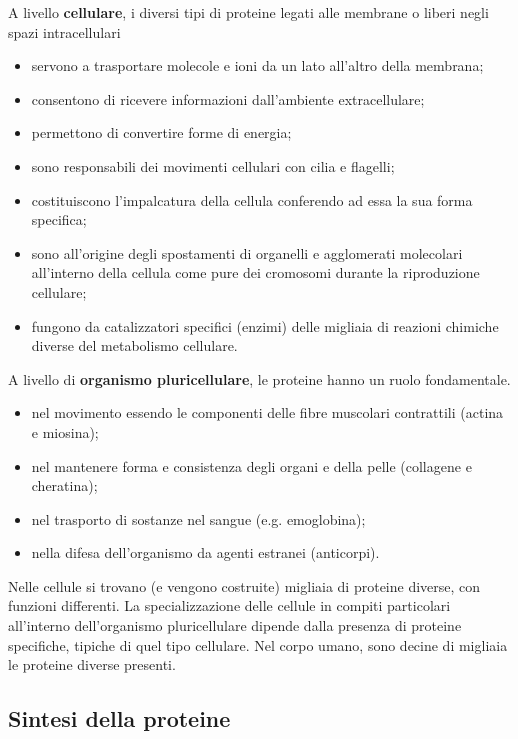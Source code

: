 \documentclass[a4paper]{article}
\begin{document}
A livello \textbf{cellulare}, i diversi tipi di proteine legati alle membrane o liberi negli spazi
intracellulari

\begin{itemize}
    \item servono a trasportare molecole e ioni da un lato all'altro della membrana;
    \item consentono di ricevere informazioni dall'ambiente extracellulare;
    \item permettono di convertire forme di energia;
    \item sono responsabili dei movimenti cellulari con cilia e flagelli;
    \item costituiscono l'impalcatura della cellula conferendo ad essa la sua forma specifica;
    \item sono all'origine degli spostamenti di organelli e agglomerati molecolari all'interno della
    cellula come pure dei cromosomi durante la riproduzione cellulare;
    \item fungono da catalizzatori specifici (enzimi) delle migliaia di reazioni chimiche diverse del
    metabolismo cellulare.
\end{itemize}

A livello di \textbf{organismo pluricellulare}, le proteine hanno un ruolo
fondamentale.

\begin{itemize}
    \item nel movimento essendo le componenti delle fibre muscolari contrattili
    (actina e miosina);
    \item nel mantenere forma e consistenza degli organi e della pelle (collagene e
    cheratina);
    \item nel trasporto di sostanze nel sangue (e.g. emoglobina);
    \item nella difesa dell'organismo da agenti estranei (anticorpi).
\end{itemize}

Nelle cellule si trovano (e vengono costruite) migliaia di proteine diverse, con
funzioni differenti. La specializzazione delle cellule in compiti particolari
all'interno dell'organismo pluricellulare dipende dalla presenza di proteine
specifiche, tipiche di quel tipo cellulare. Nel corpo umano, sono decine di
migliaia le proteine diverse presenti.

\pagebreak

\subsection{Sintesi della proteine}
\end{document}
